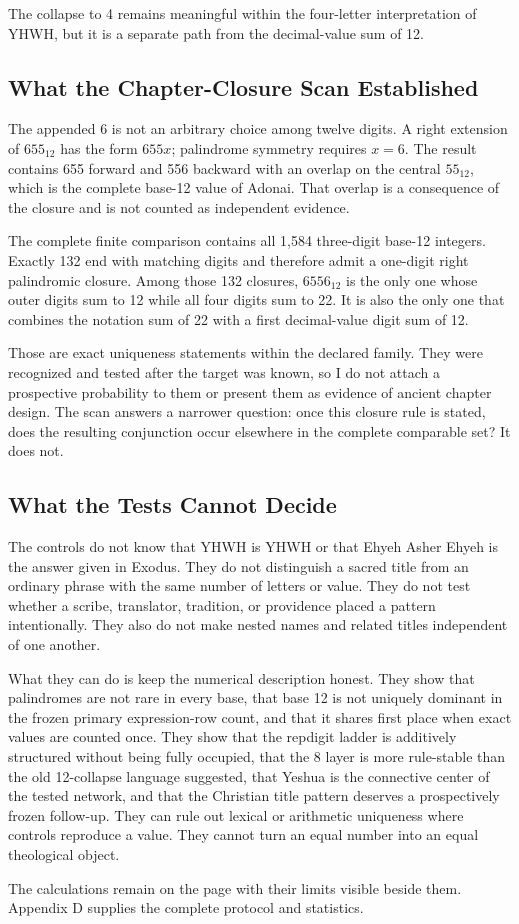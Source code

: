 The collapse to 4 remains meaningful within the four-letter interpretation of YHWH, but it is a separate path from the decimal-value sum of 12.

\subsection{What the Chapter-Closure Scan Established}

The appended 6 is not an arbitrary choice among twelve digits. A right extension of $655_{12}$ has the form $655x$; palindrome symmetry requires $x=6$. The result contains 655 forward and 556 backward with an overlap on the central $55_{12}$, which is the complete base-12 value of Adonai. That overlap is a consequence of the closure and is not counted as independent evidence.

The complete finite comparison contains all 1,584 three-digit base-12 integers. Exactly 132 end with matching digits and therefore admit a one-digit right palindromic closure. Among those 132 closures, $6556_{12}$ is the only one whose outer digits sum to 12 while all four digits sum to 22. It is also the only one that combines the notation sum of 22 with a first decimal-value digit sum of 12.

Those are exact uniqueness statements within the declared family. They were recognized and tested after the target was known, so I do not attach a prospective probability to them or present them as evidence of ancient chapter design. The scan answers a narrower question: once this closure rule is stated, does the resulting conjunction occur elsewhere in the complete comparable set? It does not.

\subsection{What the Tests Cannot Decide}

The controls do not know that YHWH is YHWH or that Ehyeh Asher Ehyeh is the answer given in Exodus. They do not distinguish a sacred title from an ordinary phrase with the same number of letters or value. They do not test whether a scribe, translator, tradition, or providence placed a pattern intentionally. They also do not make nested names and related titles independent of one another.

What they can do is keep the numerical description honest. They show that palindromes are not rare in every base, that base 12 is not uniquely dominant in the frozen primary expression-row count, and that it shares first place when exact values are counted once. They show that the repdigit ladder is additively structured without being fully occupied, that the 8 layer is more rule-stable than the old 12-collapse language suggested, that Yeshua is the connective center of the tested network, and that the Christian title pattern deserves a prospectively frozen follow-up. They can rule out lexical or arithmetic uniqueness where controls reproduce a value. They cannot turn an equal number into an equal theological object.

The calculations remain on the page with their limits visible beside them. Appendix D supplies the complete protocol and statistics.
